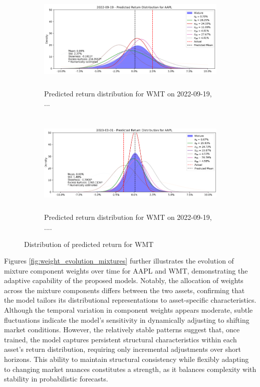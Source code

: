 \begin{figure}[H]
    \centering
    \begin{subfigure}[b]{0.49\textwidth}
        \centering
        \includegraphics[width=\linewidth, height=5cm]{Images/Results/APPL_distribution_example_1.png}
        \caption{Predicted return distribution for WMT on 2022-09-19, ... }
        \label{fig:WMT_distribution_example_1}
    \end{subfigure}
    \hfill
    \begin{subfigure}[b]{0.49\textwidth}
        \centering
        \includegraphics[width=\linewidth, height=5cm]{Images/Results/APPL_distribution_example_2.png}
        \caption{Predicted return distribution for WMT on 2022-09-19, ....}
        \label{fig:WMT_distribution_example_2}
    \end{subfigure}

    \caption{Distribution of predicted return for WMT}
    \label{fig:descriptive_analysis_of_WMT_daily_returns}
\end{figure}

Figures \ref{fig:weight_evolution_mixtures} further illustrates the evolution of mixture component weights over time for AAPL and WMT, demonstrating the adaptive capability of the proposed models. Notably, the allocation of weights across the mixture components differs between the two assets, confirming that the model tailors its distributional representations to asset-specific characteristics. Although the temporal variation in component weights appears moderate, subtle fluctuations indicate the model's sensitivity in dynamically adjusting to shifting market conditions. However, the relatively stable patterns suggest that, once trained, the model captures persistent structural characteristics within each asset’s return distribution, requiring only incremental adjustments over short horizons. This ability to maintain structural consistency while flexibly adapting to changing market nuances constitutes a strength, as it balances complexity with stability in probabilistic forecasts.

